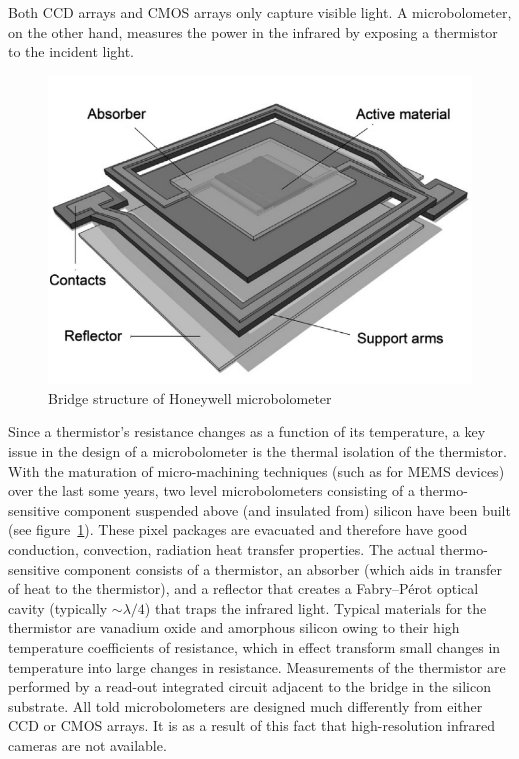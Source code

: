 Both CCD arrays and CMOS arrays only capture visible light.
%
A microbolometer, on the other hand, measures the power in the infrared by exposing a thermistor to the incident light.
%
\begin{figure}
    \center
    \includegraphics[width=.7\linewidth,keepaspectratio]{figures/microbolometer2.png}
    \caption{Bridge structure of Honeywell microbolometer\cite{KESIM2014245}}
    \label{fig:microbolometer}
\end{figure}
%
Since a thermistor's resistance changes as a function of its temperature, a key issue in the design of a microbolometer is the thermal isolation of the thermistor.
%
With the maturation of micro-machining techniques (such as for MEMS devices) over the last some years, two level microbolometers consisting of a thermo-sensitive component suspended above (and insulated from) silicon have been built (see figure~\ref{fig:microbolometer}).
%
These pixel packages are evacuated and therefore have good conduction, convection, radiation heat transfer properties.
%
The actual thermo-sensitive component consists of a thermistor, an absorber (which aids in transfer of heat to the thermistor), and a reflector that creates a Fabry–Pérot optical cavity (typically ${\sim}\lambda/4$\cite{bolometer}) that traps the infrared light.
%
Typical materials for the thermistor are vanadium oxide and amorphous silicon owing to their high temperature coefficients of resistance\cite{bolometer}, which in effect transform small changes in temperature into large changes in resistance.
%
Measurements of the thermistor are performed by a read-out integrated circuit adjacent to the bridge in the silicon substrate.
%
All told microbolometers are designed much differently from either CCD or CMOS arrays.
%
It is as a result of this fact that high-resolution infrared cameras are not available.

